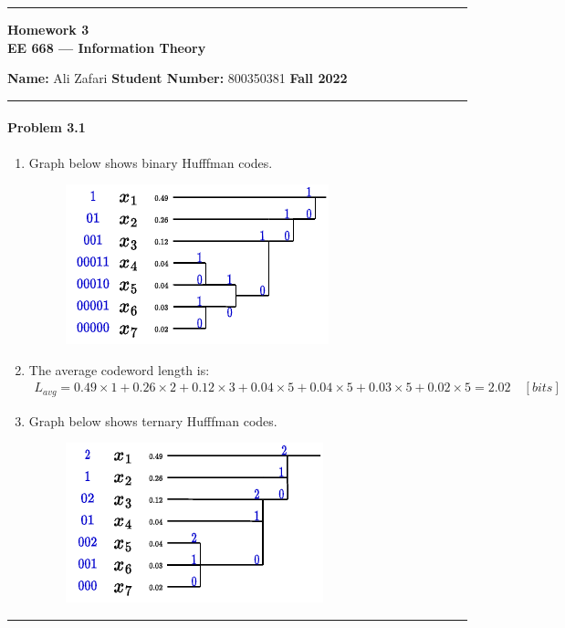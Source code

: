 \documentclass[12pt, letterpaper]{scrartcl}
\begin{document}
    \begin{center}
    	\hrule
    	\vspace{0.4cm}
    	{\textbf { {\large Homework 3} \\ EE 668 --- Information Theory}}
    \end{center}
    { \textbf{Name:} Ali Zafari \hspace{\fill} \textbf{Student Number:} 800350381 \hspace{\fill} \textbf{Fall 2022} } \newline\hrule

\paragraph*{Problem 3.1} \hfill\newline
\begin{enumerate}[((a))]
    \item
    Graph below shows binary Hufffman codes.
    \begin{figure}[H]
        \includegraphics[width=0.5\linewidth]{hw3_figures/3.1a.pdf}
        \centering
    \end{figure}
    
    \item 
    The average codeword length is:
    \begin{align*}
        L_{avg} = 0.49\times1+0.26\times2+0.12\times3+0.04\times5+0.04\times5+0.03\times5+0.02\times5=2.02 \quad[bits]
    \end{align*}
    
    \item
    Graph below shows ternary Hufffman codes.
    \begin{figure}[H]
        \includegraphics[width=0.5\linewidth]{hw3_figures/3.1c.pdf}
        \centering
    \end{figure}
\end{enumerate}
\hrule
\end{document}
